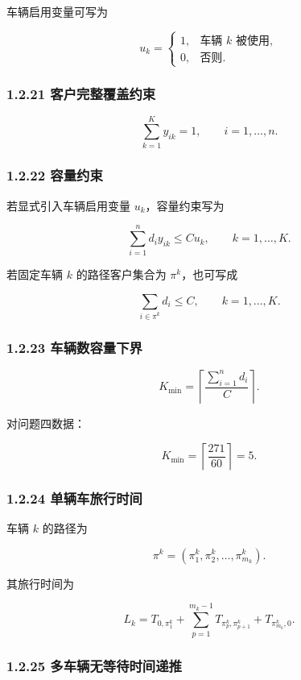\documentclass[
  a4paper,
]{ctexart}
\begin{document}
车辆启用变量可写为

\[
u_k=\begin{cases}
1, & \text{车辆 }k\text{ 被使用},\\
0, & \text{否则}.
\end{cases}
\]

\subsubsection{1.2.21
客户完整覆盖约束}\label{ux5ba2ux6237ux5b8cux6574ux8986ux76d6ux7ea6ux675f}

\[
\sum_{k=1}^{K}y_{ik}=1,\qquad i=1,\ldots,n.
\]

\subsubsection{1.2.22 容量约束}\label{ux5bb9ux91cfux7ea6ux675f}

若显式引入车辆启用变量 \(u_k\)，容量约束写为

\[
\sum_{i=1}^{n}d_i y_{ik}\le C u_k,\qquad k=1,\ldots,K.
\]

若固定车辆 \(k\) 的路径客户集合为 \(\pi^k\)，也可写成

\[
\sum_{i\in \pi^k}d_i\le C,\qquad k=1,\ldots,K.
\]

\subsubsection{1.2.23
车辆数容量下界}\label{ux8f66ux8f86ux6570ux5bb9ux91cfux4e0bux754c}

\[
K_{\min}=\left\lceil \frac{\sum_{i=1}^{n}d_i}{C}\right\rceil.
\]

对问题四数据：

\[
K_{\min}=\left\lceil \frac{271}{60}\right\rceil=5.
\]

\subsubsection{1.2.24
单辆车旅行时间}\label{ux5355ux8f86ux8f66ux65c5ux884cux65f6ux95f4}

车辆 \(k\) 的路径为

\[
\pi^k=(\pi_1^k,\pi_2^k,\ldots,\pi_{m_k}^k).
\]

其旅行时间为

\[
L_k=T_{0,\pi_1^k}+\sum_{p=1}^{m_k-1}T_{\pi_p^k,\pi_{p+1}^k}+T_{\pi_{m_k}^k,0}.
\]

\subsubsection{1.2.25
多车辆无等待时间递推}\label{ux591aux8f66ux8f86ux65e0ux7b49ux5f85ux65f6ux95f4ux9012ux63a8}
\end{document}
